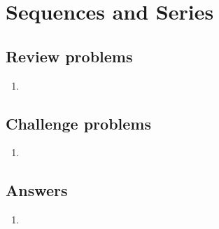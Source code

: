 \section{Sequences and Series}

\subsection{Review problems}

\begin{enumerate}
\item 
\end{enumerate}


\subsection{Challenge problems}

\begin{enumerate}[resume]
\item 
\end{enumerate}


\newpage
\subsection{Answers}

\begin{enumerate}
\item 
\end{enumerate}
